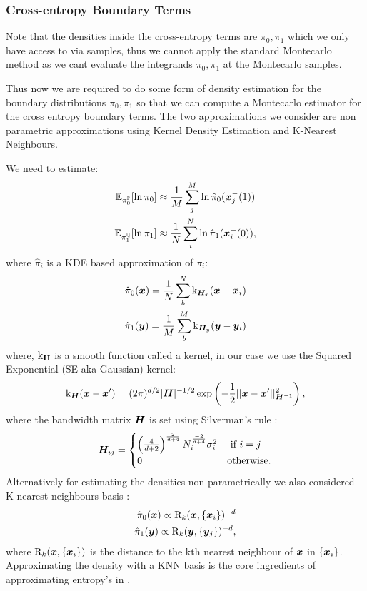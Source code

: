 \documentclass[a4paper,12pt,twoside,openright]{report}
\theoremstyle{definition}
\begin{document}
\subsubsection{Cross-entropy Boundary Terms}

Note that the densities inside the cross-entropy terms are $\pi_0, \pi_1$ which we only have access to via samples, thus we cannot apply the standard Montecarlo method as we cant evaluate the integrands $\pi_0, \pi_1$ at the Montecarlo samples.

Thus now we are required to do some form of density estimation for the boundary distributions $\pi_0, \pi_1$ so that we can compute a Montecarlo estimator for the cross entropy boundary terms. The two approximations we consider are non parametric approximations using Kernel Density Estimation and K-Nearest Neighbours.

We need to estimate:
\begin{align*}
\mathbb{E}_{\pi_0^{\mathbb{P}}}[\ln\pi_{0}] &\approx \frac{1}{M}\sum_{j}^{M} \ln \hat{\pi}_0({\bm{x}}_j^{-}(1)) \\
\mathbb{E}_{\pi_1^{\mathbb{Q}}}[\ln\pi_{1}] &\approx \frac{1}{N}\sum_{i}^{N} \ln \hat{\pi}_1({\bm{x}}_i^{+}(0)),
\end{align*}
where $\hat{\pi}_i$ is a KDE based approximation of $\pi_i$:
\begin{align*}
\hat{\pi}_0({\bm{x}}) = \frac{1}{N} \sum_b^{N} {\text{k}}_{{\bm{H}}_x}({\bm{x}} - {\bm{x}}_i) \\
\hat{\pi}_1({\bm{y}}) = \frac{1}{M} \sum_b^{M} {\text{k}}_{{\bm{H}}_y}({\bm{y}} - {\bm{y}}_i)
\end{align*}
where, ${\text{k}}_{\textbf{H}}$ is a smooth function called a kernel, in our case we use the Squared Exponential (SE aka Gaussian) kernel:
\begin{align*}
{\text{k}}_{{\bm{H}}}({\bm{x}}-{\bm{x}}') = (2\pi)^{d/2}|{\bm{H}}|^{-1/2}\exp\left(-\frac{1}{2}||{\bm{x}}-{\bm{x}}'||^{2}_{{\bm{H}}^{-1}}\right),
\end{align*}
where the bandwidth matrix ${\bm{H}}$ is set using Silverman's rule :
\begin{align}
{\bm{H}}_{ij} = \begin{cases}
\left(\frac{4}{d+2}\right)^{\frac{2}{d+4}} N_i^{\frac{-2}{d+4}} \sigma_{i}^2  &\text{  if  } i=j \\
0  &\text{otherwise}.
\end{cases}
\end{align}
Alternatively for estimating the densities non-parametrically we also considered K-nearest neighbours basis \citep{veksler2013nonparametric}:
\begin{align*}
\hat{\pi}_0({\bm{x}}) \propto  \text{R}_k({\bm{x}}, \{{\bm{x}}_i\})^{-d}\\
\hat{\pi}_1({\bm{y}}) \propto \text{R}_k({\bm{y}}, \{{\bm{y}}_j\})^{-d},
\end{align*}
where $\text{R}_k({\bm{x}}, \{{\bm{x}}_i\})$ is the distance to the kth nearest neighbour of ${\bm{x}}$ in $\{{\bm{x}}_i\}$.  Approximating the density with a KNN basis is the core ingredients of approximating entropy's in \cite{singh2016analysis}.
\end{document}
